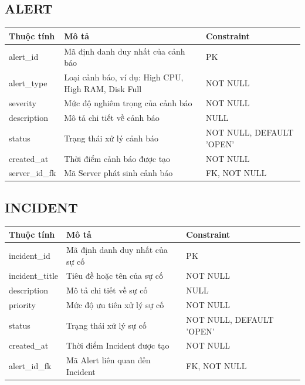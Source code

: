 \subsection{ALERT}
\begin{center}
\begin{longtable}{|>{\raggedright\arraybackslash}p{3.5cm}|>{\raggedright\arraybackslash}p{6.5cm}|>{\raggedright\arraybackslash}p{4.5cm}|}
\hline
\textbf{Thuộc tính} & \textbf{Mô tả} & \textbf{Constraint} \\ \hline
\endhead
alert\_id & Mã định danh duy nhất của cảnh báo & PK \\ \hline
alert\_type & Loại cảnh báo, ví dụ: High CPU, High RAM, Disk Full & NOT NULL \\ \hline
severity & Mức độ nghiêm trọng của cảnh báo & NOT NULL \\ \hline
description & Mô tả chi tiết về cảnh báo & NULL \\ \hline
status & Trạng thái xử lý cảnh báo & NOT NULL, DEFAULT 'OPEN' \\ \hline
created\_at & Thời điểm cảnh báo được tạo & NOT NULL \\ \hline
server\_id\_fk & Mã Server phát sinh cảnh báo & FK, NOT NULL \\ \hline
\end{longtable}
\end{center}

\subsection{INCIDENT}
\begin{center}
\begin{longtable}{|>{\raggedright\arraybackslash}p{3.5cm}|>{\raggedright\arraybackslash}p{6.5cm}|>{\raggedright\arraybackslash}p{4.5cm}|}
\hline
\textbf{Thuộc tính} & \textbf{Mô tả} & \textbf{Constraint} \\ \hline
\endhead
incident\_id & Mã định danh duy nhất của sự cố & PK \\ \hline
incident\_title & Tiêu đề hoặc tên của sự cố & NOT NULL \\ \hline
description & Mô tả chi tiết về sự cố & NULL \\ \hline
priority & Mức độ ưu tiên xử lý sự cố & NOT NULL \\ \hline
status & Trạng thái xử lý sự cố & NOT NULL, DEFAULT 'OPEN' \\ \hline
created\_at & Thời điểm Incident được tạo & NOT NULL \\ \hline
alert\_id\_fk & Mã Alert liên quan đến Incident & FK, NOT NULL \\ \hline
\end{longtable}
\end{center}

